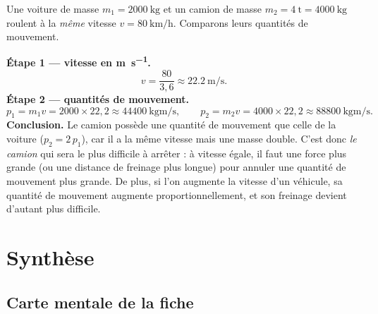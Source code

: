 \documentclass[11pt,a4paper]{article}
\begin{document}
\begin{exemple}
Une voiture de masse $m_1=\SI{2000}{\kilogram}$ et un camion de masse $m_2=\SI{4}{\tonne}=\SI{4000}{\kilogram}$
roulent à la \emph{même} vitesse $v=\SI{80}{\kilo\metre\per\hour}$. Comparons leurs quantités de
mouvement.

\smallskip
\textbf{Étape 1 — vitesse en \si{\metre\per\second}.}
\[
v=\frac{80}{3{,}6}\approx\SI{22,2}{\metre\per\second}.
\]
\textbf{Étape 2 — quantités de mouvement.}
\[
p_1=m_1 v=2000\times22{,}2\approx\SI{44400}{\kilogram\metre\per\second},\qquad
p_2=m_2 v=4000\times22{,}2\approx\SI{88800}{\kilogram\metre\per\second}.
\]
\textbf{Conclusion.} Le camion possède une quantité de mouvement 
que celle de la voiture ($p_2=2\,p_1$), car il a la même vitesse mais une masse double. C'est donc
\emph{le camion} qui sera le plus difficile à arrêter : à vitesse égale, il faut une force plus grande
(ou une distance de freinage plus longue) pour annuler une quantité de mouvement plus grande. De plus,
si l'on augmente la vitesse d'un véhicule, sa quantité de mouvement augmente proportionnellement, et
son freinage devient d'autant plus difficile.
\end{exemple}

\section{Synthèse}
\subsection{Carte mentale de la fiche}
\end{document}
